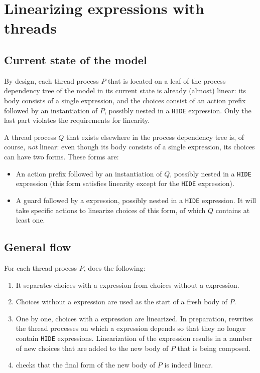 \section{Linearizing expressions with threads}

\subsection*{Current state of the model}

By design, each thread process $P$ that is located on a leaf of the process dependency tree of the model in its current state is already (almost) linear: its body consists of a single \choice{} expression, and the choices consist of an action prefix followed by an instantiation of $P$, possibly nested in a \texttt{HIDE} expression.
Only the last part violates the requirements for linearity.

A thread process $Q$ that exists elsewhere in the process dependency tree is, of course, \emph{not} linear: even though its body consists of a single \choice{} expression, its choices can have two forms.
These forms are:
\begin{itemize}
\item An action prefix followed by an instantiation of $Q$, possibly nested in a \texttt{HIDE} expression (this form satisfies linearity except for the \texttt{HIDE} expression).
\item A guard followed by a \pedi{} expression, possibly nested in a \texttt{HIDE} expression.
It will take specific actions to linearize choices of this form, of which $Q$ contains at least one.
\end{itemize}

\subsection*{General flow}

For each thread process $P$, \lpeq{} does the following:
\begin{enumerate}[1.]
\item It separates choices with a \pedi{} expression from choices without a \pedi{} expression.
\item Choices without a \pedi{} expression are used as the start of a fresh body of $P$.
\item One by one, choices with a \pedi{} expression are linearized.
In preparation, \lpeq{} rewrites the thread processes on which a \pedi{} expression depends so that they no longer contain \texttt{HIDE} expressions.
Linearization of the \pedi{} expression results in a number of new choices that are added to the new body of $P$ that is being composed.
\item \lpeq{} checks that the final form of the new body of $P$ is indeed linear.
\end{enumerate}

